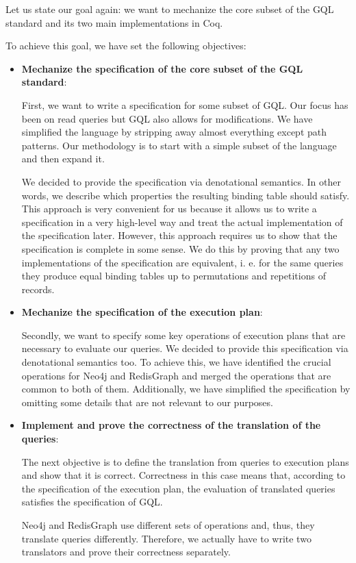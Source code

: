 \documentclass[14pt]{constructor-thesis}
\theoremstyle{definition}
\begin{document}
Let us state our goal again: we want to mechanize the core subset of the GQL standard and its two main implementations in Coq.

To achieve this goal, we have set the following objectives:
\begin{itemize}
  \item \textbf{Mechanize the specification of the core subset of the GQL standard}:
  
  First, we want to write a specification for some subset of GQL. Our focus has been on read queries but GQL also allows for modifications. We have simplified the language by stripping away almost everything except path patterns. Our methodology is to start with a simple subset of the language and then expand it.

  We decided to provide the specification via denotational semantics. In other words, we describe which properties the resulting binding table should satisfy. This approach is very convenient for us because it allows us to write a specification in a very high-level way and treat the actual implementation of the specification later. However, this approach requires us to show that the specification is complete in some sense. We do this by proving that any two implementations of the specification are equivalent, i. e. for the same queries they produce equal binding tables up to permutations and repetitions of records.

  \item \textbf{Mechanize the specification of the execution plan}:
  
  Secondly, we want to specify some key operations of execution plans that are necessary to evaluate our queries. We decided to provide this specification via denotational semantics too. To achieve this, we have identified the crucial operations for Neo4j and RedisGraph and merged the operations that are common to both of them. Additionally, we have simplified the specification by omitting some details that are not relevant to our purposes.

  \item \textbf{Implement and prove the correctness of the translation of the queries}:
  
  The next objective is to define the translation from queries to execution plans and show that it is correct. Correctness in this case means that, according to the specification of the execution plan, the evaluation of translated queries satisfies the specification of GQL.

  Neo4j and RedisGraph use different sets of operations and, thus, they translate queries differently. Therefore, we actually have to write two translators and prove their correctness separately.


\end{itemize}
\end{document}
